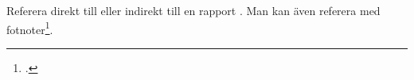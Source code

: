 \documentclass{article}
\begin{document}
  \thispagestyle{empty}
  \begin{preview}\begin{minipage}{0.9\textwidth}
  	Referera direkt till \textcite{Hassanpour08}
  	eller indirekt till en rapport \parencite{Hassanpour08}.
  	Man kan även referera med fotnoter\footcite{Hassanpour08}.
  	\printbibliography
  \end{minipage}\end{preview}
\end{document}
